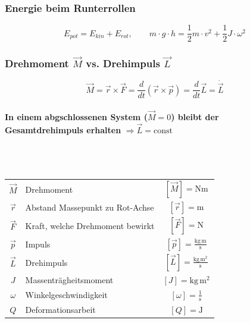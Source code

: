 		\subsubsection{Energie beim Runterrollen}

			$$ \boxed{E_{pot} = E_{kin} + E_{rot} , \quad \quad m \cdot g \cdot h = \frac{1}{2}m \cdot v^2 + \frac{1}{2}J \cdot \omega^2} $$

		\subsubsection{Drehmoment $\vec{M}$ vs. Drehimpuls $\vec{L}$}
			$$ \boxed{ \vec{M} = \vec{r} \times \vec{F} = \frac{d}{dt} (\vec{r} \times \vec{p}) =  \frac{d}{dt} \vec{L} = \dot{\vec{L}} }$$ \\
			
			\textbf{In einem abgschlossenen System ($\vec{M} = 0$) bleibt der \\
			Gesamtdrehimpuls erhalten} $\Rightarrow \vec{L} = \text{const}$ \\
			\\
			\\
			\\
			\begin{tabular}{c l c}
				$\vec{M}$ & Drehmoment & $[\vec{M}] = \mathrm{Nm}$ \\
				$\vec{r}$ & Abstand Massepunkt zu Rot-Achse & $[\vec{r}] = \mathrm{m}$ \\
				$\vec{F}$ & Kraft, welche Drehmoment bewirkt & $[\vec{F}] = \mathrm{N}$ \\
				$\vec{p}$ & Impuls & $[\vec{p}] = \mathrm{\frac{kg \, m}{s}}$ \\
				$\vec{L}$ & Drehimpuls & $[\vec{L}] = \mathrm{\frac{kg \, m^2}{s}}$ \\
				$J$  & Massenträgheitsmoment & $[J] = \mathrm{kg \, m^2}$ \\
				$\omega$ & Winkelgeschwindigkeit & $[\omega] = \mathrm{\frac{1}{s}}$ \\
				$Q$ & Deformationsarbeit & $[Q] = \mathrm{J}$ \\
			\end{tabular}

